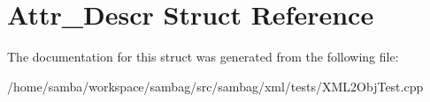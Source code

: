\hypertarget{struct_attr___descr}{
\section{Attr\_\-Descr Struct Reference}
\label{struct_attr___descr}
}


The documentation for this struct was generated from the following file:\begin{DoxyCompactItemize}
\item 
/home/samba/workspace/sambag/src/sambag/xml/tests/XML2ObjTest.cpp\end{DoxyCompactItemize}
